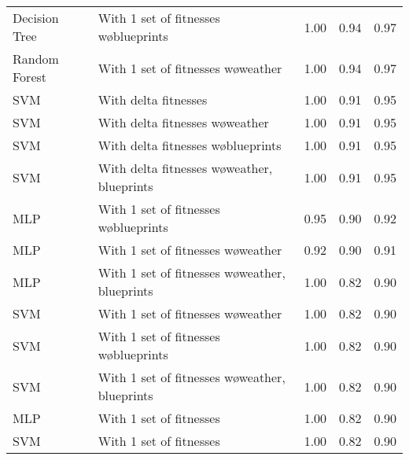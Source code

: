\begin{tabular}{llrrr}
 Decision Tree &          With 1 set of fitnesses w\o blueprints &       1.00 &    0.94 & 0.97 \\
 Random Forest &             With 1 set of fitnesses w\o weather &       1.00 &    0.94 & 0.97 \\
           SVM &                            With delta fitnesses &       1.00 &    0.91 & 0.95 \\
           SVM &                With delta fitnesses w\o weather &       1.00 &    0.91 & 0.95 \\
           SVM &             With delta fitnesses w\o blueprints &       1.00 &    0.91 & 0.95 \\
           SVM &    With delta fitnesses w\o weather, blueprints &       1.00 &    0.91 & 0.95 \\
           MLP &          With 1 set of fitnesses w\o blueprints &       0.95 &    0.90 & 0.92 \\
           MLP &             With 1 set of fitnesses w\o weather &       0.92 &    0.90 & 0.91 \\
           MLP & With 1 set of fitnesses w\o weather, blueprints &       1.00 &    0.82 & 0.90 \\
           SVM &             With 1 set of fitnesses w\o weather &       1.00 &    0.82 & 0.90 \\
           SVM &          With 1 set of fitnesses w\o blueprints &       1.00 &    0.82 & 0.90 \\
           SVM & With 1 set of fitnesses w\o weather, blueprints &       1.00 &    0.82 & 0.90 \\
           MLP &                         With 1 set of fitnesses &       1.00 &    0.82 & 0.90 \\
           SVM &                         With 1 set of fitnesses &       1.00 &    0.82 & 0.90 \\
\bottomrule
\end{tabular}
